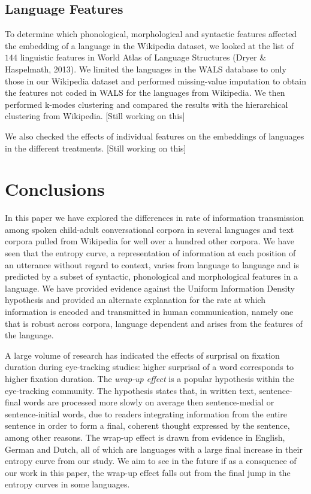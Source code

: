 \documentclass[10pt, letterpaper]{article}
\begin{document}
\subsection{Language Features}\label{language-features}

To determine which phonological, morphological and syntactic features
affected the embedding of a language in the Wikipedia dataset, we looked
at the list of \(144\) linguistic features in World Atlas of Language
Structures (Dryer \& Haspelmath, 2013). We limited the languages in the
WALS database to only those in our Wikipedia dataset and performed
missing-value imputation to obtain the features not coded in WALS for
the languages from Wikipedia. We then performed k-modes clustering and
compared the results with the hierarchical clustering from Wikipedia.
{[}Still working on this{]}

We also checked the effects of individual features on the embeddings of
languages in the different treatments. {[}Still working on this{]}

\section{Conclusions}\label{conclusions}

In this paper we have explored the differences in rate of information
transmission among spoken child-adult conversational corpora in several
languages and text corpora pulled from Wikipedia for well over a hundred
other corpora. We have seen that the entropy curve, a representation of
information at each position of an utterance without regard to context,
varies from language to language and is predicted by a subset of
syntactic, phonological and morphological features in a language. We
have provided evidence against the Uniform Information Density
hypothesis and provided an alternate explanation for the rate at which
information is encoded and transmitted in human communication, namely
one that is robust across corpora, language dependent and arises from
the features of the language.

A large volume of research has indicated the effects of surprisal on
fixation duration during eye-tracking studies: higher surprisal of a
word corresponds to higher fixation duration. The \emph{wrap-up effect}
is a popular hypothesis within the eye-tracking community. The
hypothesis states that, in written text, sentence-final words are
processed more slowly on average then sentence-medial or
sentence-initial words, due to readers integrating information from the
entire sentence in order to form a final, coherent thought expressed by
the sentence, among other reasons. The wrap-up effect is drawn from
evidence in English, German and Dutch, all of which are languages with a
large final increase in their entropy curve from our study. We aim to
see in the future if as a consquence of our work in this paper, the
wrap-up effect falls out from the final jump in the entropy curves in
some languages.

\setlength{\parindent}{-0.1in} \setlength{\leftskip}{0.125in} \noindent


\end{document}
